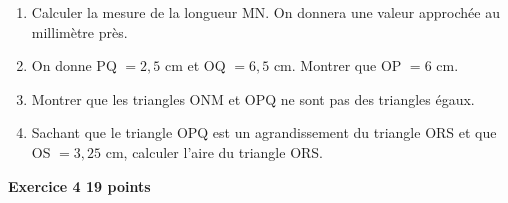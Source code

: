 \documentclass[11pt]{article}
\begin{document}
\medskip

\begin{enumerate}
\item Calculer la mesure de la longueur MN. On donnera une valeur approchée au millimètre près.
\item On donne PQ $= 2,5$ cm et OQ $= 6,5$ cm. Montrer que OP $= 6$ cm.
\item Montrer que les triangles ONM et OPQ ne sont pas des triangles égaux.
\item Sachant que le triangle OPQ est un agrandissement du triangle ORS et que OS $= 3,25$ cm, calculer l'aire du triangle ORS.
\end{enumerate}


\bigskip

\textbf{\large{}Exercice 4 \hfill 19 points}

\medskip
\end{document}
